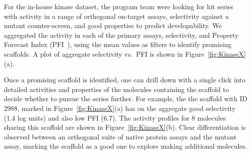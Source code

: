 \documentclass[journal=jacsat,manuscript=article]{achemso}
\newcommand*\fref[1]{Figure~\ref{fig:#1}}
\newcommand*\vs{vs.~}
\begin{document}
For the in-house kinase dataset, the program team were looking for hit series with activity in a range of orthogonal on-target assays, selectivity against a mutant counter-screen, and good properties to predict developability.  We aggregated the activity in each of the primary assays, selectivity, and Property Forecast Index (PFI~\cite{Young2011}), using the mean values as filters to identify promising scaffolds.  A plot of aggregate selectivity \vs PFI is shown in \fref{KinaseX}(a).

Once a promising scaffold is identified, one can drill down with a single click into detailed activities and properties of the molecules containing the scaffold to decide whether to pursue the series further. For example, the
the scaffold with ID 2988, marked in \fref{KinaseX}(a) has on the aggregate good selectivity (1.4 log units) and also low PFI (6.7). The activity profiles for 8
molecules sharing this scaffold are shown in \fref{KinaseX}(b). Clear differentiation is observed between an orthogonal suite of native protein assays and the mutant assay, marking the scaffold as a good one to explore making additional molecules.
\end{document}
